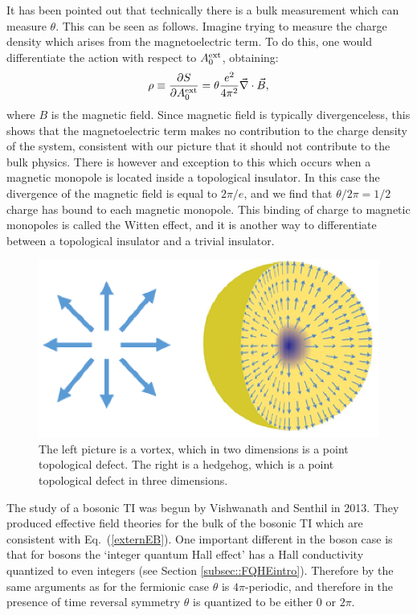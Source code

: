 It has been pointed out \cite{FranzWitten} that technically there is a bulk measurement which can measure $\theta$. This can be seen as follows. Imagine trying to measure the charge density which arises from the magnetoelectric term. To do this, one would differentiate the action with respect to $A^{\rm ext}_0$, obtaining:
\begin{equation}
\rho\equiv\frac{\partial S}{\partial A^{\rm ext}_0}=\theta\frac{e^2}{4\pi^2}\vec{\nabla}\cdot \vec{B},
\end{equation}
where $B$ is the magnetic field. Since magnetic field is typically divergenceless, this shows that the magnetoelectric term makes no contribution to the charge density of the system, consistent with our picture that it should not contribute to the bulk physics. There is however and exception to this which occurs when a magnetic monopole is located inside a topological insulator. In this case the divergence of the magnetic field is equal to $2\pi/e$, and we find that $\theta/2\pi=1/2$ charge has bound to each magnetic monopole. This binding of charge to magnetic monopoles is called the Witten effect, and it is another way to differentiate between a topological insulator and a trivial insulator. 

\begin{figure}
\includegraphics[width=\linewidth]{figures/defects.eps}
\caption{ The left picture is a vortex, which in two dimensions is a point topological defect. The right is a hedgehog, which is a point topological defect in three dimensions.
\label{topo_defects}}
\end{figure}

The study of a bosonic TI was begun by Vishwanath and Senthil in 2013\cite{SenthilVishwanath}. They produced effective field theories for the bulk of the bosonic TI which are consistent with Eq.~(\ref{externEB}). One important different in the boson case is that for bosons the `integer quantum Hall effect' has a Hall conductivity quantized to even integers (see Section \ref{subsec::FQHEintro}). Therefore by the same arguments as for the fermionic case $\theta$ is $4\pi$-periodic, and therefore in the presence of time reversal symmetry $\theta$ is quantized to be either $0$ or $2\pi$. 

